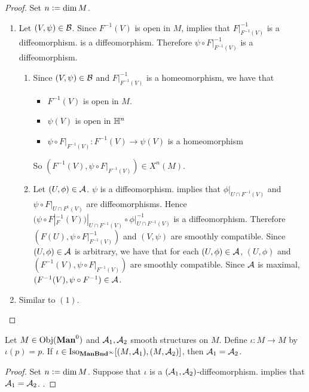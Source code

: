 \documentclass{book}
\begin{document}
\begin{proof} Set $n \vcentcolon= \dim M$. 
	\begin{enumerate}
		\item Let $(V, \psi) \in \mathcal{B}$. Since $F^{-1}(V)$ is open in $M$,  implies that $F|_{F^{-1}(V)}^{-1}$ is a diffeomorphism.  is a diffeomorphism. Therefore $\psi \circ F|_{F^{-1}(V)}^{-1}$ is a diffeomorphism.
		\begin{enumerate}
			\item Since $(V, \psi) \in \mathcal{B}$ and $F|_{F^{-1}(V)}^{-1}$ is a homeomorphism, we have that
			\begin{itemize}
				\item $F^{-1}(V)$ is open in $M$.
				\item $\psi(V)$ is open in $\mathbb{H}^n$
				\item $\psi \circ F|_{F^{-1}(V)}: F^{-1}(V)  \rightarrow \psi(V)$ is a homeomorphism
			\end{itemize}
			So $(F^{-1}(V), \psi \circ F|_{F^{-1}(V)}) \in X^n(M)$. 
			\item Let $(U, \phi) \in \mathcal{A}$.  $\psi$ is a diffeomorphism.  implies that $\phi|_{U \cap F^{-1}(V)}$ and $\psi \circ F|_{U \cap F^{1}(V)}$ are diffeomorphisms. Hence $(\psi \circ F|_F^{-1}(V))|_{U \cap F^{-1}(V)} \circ \phi|_{U \cap F^{-1}(V)}^{-1}$ is a diffeomorphism. Therefore $(F(U), \psi \circ F|_{F^{-1}(V)}^{-1})$ and $(V, \psi)$ are smoothly compatible. Since $(U, \phi) \in \mathcal{A}$ is arbitrary, we have that for each $(U, \phi) \in \mathcal{A}$, $(U, \phi)$ and $(F^{-1}(V), \psi \circ F|_{F^{-1}(V)})$ are smoothly compatible. Since $\mathcal{A}$ is maximal, $(F^{-1}(V), \psi \circ F^{-1}) \in \mathcal{A}$.
		\end{enumerate}
		\item Similar to $(1)$.
	\end{enumerate}
\end{proof}

\begin{ex} 
	Let $M \in \operatorname{Obj}(\operatorname*{\text{\textbf{Man}}^0})$ and $\mathcal{A}_1, \mathcal{A}_2$ smooth structures on $M$. Define $\iota:M \rightarrow M$ by $\iota(p) = p$. If $\iota \in \operatorname{Iso}_{\operatorname*{\text{\textbf{ManBnd}}^{\infty}}}[(M, \mathcal{A}_1), (M, \mathcal{A}_2)]$, then $\mathcal{A}_1 = \mathcal{A}_2$.
\end{ex}

\begin{proof} Set $n \vcentcolon= \dim M$. 
	Suppose that $\iota$ is a $(\mathcal{A}_1, \mathcal{A}_2)$-diffeomorphism.  implies that $\mathcal{A}_1 = \mathcal{A}_2$. .
\end{proof}
\end{document}
